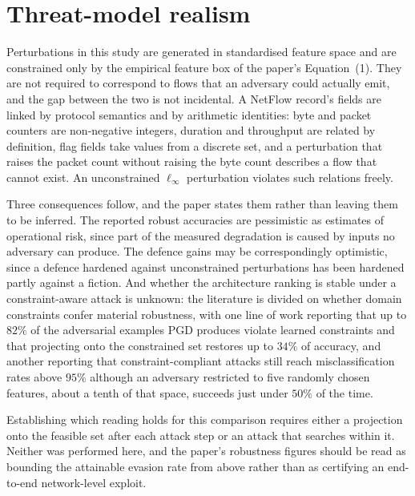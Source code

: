 \documentclass[11pt,a4paper]{article}
\begin{document}
\section{Threat-model realism}
\label{sup:threat}

Perturbations in this study are generated in standardised feature space
and are constrained only by the empirical feature box of the paper's
Equation~(1). They are not required to correspond to flows that an
adversary could actually emit, and the gap between the two is not
incidental. A NetFlow record's fields are linked by protocol semantics
and by arithmetic identities: byte and packet counters are
non-negative integers, duration and throughput are related by
definition, flag fields take values from a discrete set, and a
perturbation that raises the packet count without raising the byte
count describes a flow that cannot exist. An unconstrained
$\ell_{\infty}$ perturbation violates such relations freely.

Three consequences follow, and the paper states them rather than
leaving them to be inferred. The reported robust accuracies are
pessimistic as estimates of operational risk, since part of the
measured degradation is caused by inputs no adversary can produce. The
defence gains may be correspondingly optimistic, since a defence
hardened against unconstrained perturbations has been hardened partly
against a fiction. And whether the architecture ranking is stable under
a constraint-aware attack is unknown: the literature is divided on
whether domain constraints confer material robustness, with one line of
work reporting that up to $82\%$ of the adversarial examples PGD
produces violate learned constraints and that projecting onto the
constrained set restores up to $34\%$ of accuracy, and another
reporting that constraint-compliant attacks still reach
misclassification rates above $95\%$ although an adversary restricted
to five randomly chosen features, about a tenth of that space, succeeds
just under $50\%$ of the time.

Establishing which reading holds for this comparison requires either a
projection onto the feasible set after each attack step or an attack
that searches within it. Neither was performed here, and the paper's
robustness figures should be read as bounding the attainable evasion
rate from above rather than as certifying an end-to-end network-level
exploit.

\end{document}
